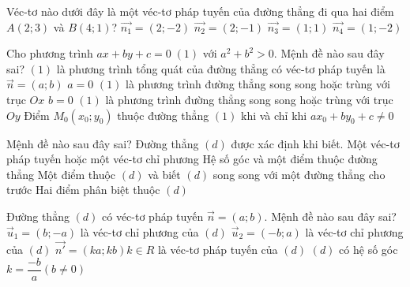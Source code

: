 \begin{ex}%
	Véc-tơ nào dưới đây là một véc-tơ pháp tuyến của đường thẳng đi qua hai điểm $A\left(2;3\right)$ và $B\left(4;1\right)$?
	\choice
	{$\overrightarrow{n_1}=\left(2;-2\right)$}
	{$\overrightarrow{n_2}=\left(2;-1\right)$}
	{\True $\overrightarrow{n_3}=\left(1;1\right)$}
	{$\overrightarrow{n_4}=\left(1;-2\right)$}
\end{ex}
\begin{ex}%
	Cho phương trình $ax+by+c=0\; (1)$ với $a^2+b^2> 0$. Mệnh đề nào sau đây sai?
	\choice
	{$(1)$ là phương trình tổng quát của đường thẳng có véc-tơ pháp tuyến là $\overrightarrow{n}=\left(a;b\right)$}
	{$a=0$ $(1)$ là phương trình đường thẳng song song hoặc trùng với trục $Ox$}
	{$b=0$ $(1)$ là phương trình đường thẳng song song hoặc trùng với trục $Oy$}
	{\True Điểm $M_0 \left(x_0;y_0 \right)$ thuộc đường thẳng $(1)$ khi và chỉ khi $ax_0+by_0+c\ne 0$}
\end{ex}
\begin{ex}%
	Mệnh đề nào sau đây sai? Đường thẳng $(d)$ được xác định khi biết.
	\choice
	{\True Một véc-tơ pháp tuyến hoặc một véc-tơ chỉ phương}
	{Hệ số góc và một điểm thuộc đường thẳng}
	{Một điểm thuộc $(d)$ và biết $(d)$ song song với một đường thẳng cho trước}
	{Hai điểm phân biệt thuộc $(d)$}
\end{ex}
\begin{ex}%
	Đường thẳng $(d)$ có  véc-tơ  pháp tuyến $\overrightarrow{n}=\left(a;b\right)$. Mệnh đề nào sau đây sai?
	\choice
	{$\overrightarrow{u}_1=\left(b;-a\right)$ là véc-tơ chỉ phương của $(d)$}
	{$\overrightarrow{u}_2=\left(-b;a\right)$ là véc-tơ chỉ phương của $(d)$}
	{$\overrightarrow{n'}=\left(ka;kb\right) k\in R$ là véc-tơ pháp tuyến của $(d)$}
	{\True $(d)$ có hệ số góc $k=\dfrac{-b}{a} \left(b\ne 0\right)$}
\end{ex}
